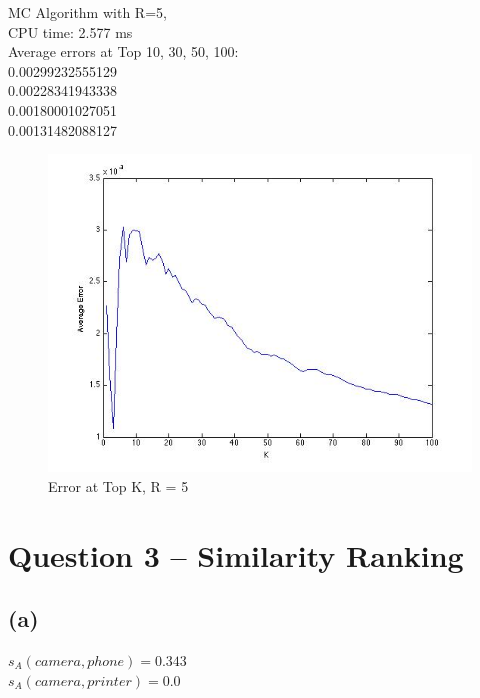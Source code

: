 \documentclass{article}
\begin{document}
MC Algorithm with R=5, \\
\indent CPU time: 2.577 ms\\
\indent Average errors at Top 10, 30, 50, 100:\\
0.00299232555129 \\
0.00228341943338 \\
0.00180001027051 \\
0.00131482088127\\

\begin{figure}[H]
\centering
\includegraphics[scale=0.5]{q2-ErrorTopK-R5.jpg}
\caption{ Error at Top K, R = 5}
\label{}
\end{figure}

\section{Question 3 -- Similarity Ranking}
\subsection{(a)}
$s_A(camera, phone) = 0.343$\\
$s_A(camera, printer) = 0.0$\\
\end{document}
